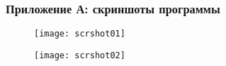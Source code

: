 \begin{frame}
    \frametitle{Приложение А: скриншоты программы}
    \begin{figure}
        \begin{minipage}{0.49\textwidth}
            \texttt{[image: scrshot01]}
        \end{minipage}
        \begin{minipage}{0.49\textwidth}
            \texttt{[image: scrshot02]}
        \end{minipage}
    \end{figure}
\end{frame}
